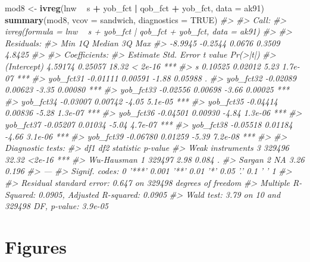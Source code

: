 \documentclass[]{book}
\newenvironment{Shaded}{\begin{snugshade}}{\end{snugshade}}
\newcommand{\CommentTok}[1]{\textcolor[rgb]{0.56,0.35,0.01}{\textit{#1}}}
\newcommand{\DataTypeTok}[1]{\textcolor[rgb]{0.13,0.29,0.53}{#1}}
\newcommand{\KeywordTok}[1]{\textcolor[rgb]{0.13,0.29,0.53}{\textbf{#1}}}
\newcommand{\NormalTok}[1]{#1}
\newcommand{\OperatorTok}[1]{\textcolor[rgb]{0.81,0.36,0.00}{\textbf{#1}}}
\newcommand{\OtherTok}[1]{\textcolor[rgb]{0.56,0.35,0.01}{#1}}
\newcommand{\StringTok}[1]{\textcolor[rgb]{0.31,0.60,0.02}{#1}}
\theoremstyle{definition}
\theoremstyle{definition}
\theoremstyle{definition}
\theoremstyle{remark}
\begin{document}
\begin{Shaded}
\begin{Highlighting}[]
\NormalTok{mod8 <-}\StringTok{ }\KeywordTok{ivreg}\NormalTok{(lnw }\OperatorTok{~}\StringTok{ }\NormalTok{s }\OperatorTok{+}\StringTok{ }\NormalTok{yob_fct }\OperatorTok{|}\StringTok{ }\NormalTok{qob_fct }\OperatorTok{+}\StringTok{ }\NormalTok{yob_fct, }\DataTypeTok{data =}\NormalTok{ ak91)}
\KeywordTok{summary}\NormalTok{(mod8, }\DataTypeTok{vcov =}\NormalTok{ sandwich, }\DataTypeTok{diagnostics =} \OtherTok{TRUE}\NormalTok{)}
\CommentTok{#> }
\CommentTok{#> Call:}
\CommentTok{#> ivreg(formula = lnw ~ s + yob_fct | qob_fct + yob_fct, data = ak91)}
\CommentTok{#> }
\CommentTok{#> Residuals:}
\CommentTok{#>     Min      1Q  Median      3Q     Max }
\CommentTok{#> -8.9945 -0.2544  0.0676  0.3509  4.8425 }
\CommentTok{#> }
\CommentTok{#> Coefficients:}
\CommentTok{#>             Estimate Std. Error t value Pr(>|t|)    }
\CommentTok{#> (Intercept)  4.59174    0.25057   18.32  < 2e-16 ***}
\CommentTok{#> s            0.10525    0.02012    5.23  1.7e-07 ***}
\CommentTok{#> yob_fct31   -0.01111    0.00591   -1.88  0.05988 .  }
\CommentTok{#> yob_fct32   -0.02089    0.00623   -3.35  0.00080 ***}
\CommentTok{#> yob_fct33   -0.02556    0.00698   -3.66  0.00025 ***}
\CommentTok{#> yob_fct34   -0.03007    0.00742   -4.05  5.1e-05 ***}
\CommentTok{#> yob_fct35   -0.04414    0.00836   -5.28  1.3e-07 ***}
\CommentTok{#> yob_fct36   -0.04501    0.00930   -4.84  1.3e-06 ***}
\CommentTok{#> yob_fct37   -0.05207    0.01034   -5.04  4.7e-07 ***}
\CommentTok{#> yob_fct38   -0.05518    0.01184   -4.66  3.1e-06 ***}
\CommentTok{#> yob_fct39   -0.06780    0.01259   -5.39  7.2e-08 ***}
\CommentTok{#> }
\CommentTok{#> Diagnostic tests:}
\CommentTok{#>                     df1    df2 statistic p-value    }
\CommentTok{#> Weak instruments      3 329496     32.32  <2e-16 ***}
\CommentTok{#> Wu-Hausman            1 329497      2.98   0.084 .  }
\CommentTok{#> Sargan                2     NA      3.26   0.196    }
\CommentTok{#> ---}
\CommentTok{#> Signif. codes:  0 '***' 0.001 '**' 0.01 '*' 0.05 '.' 0.1 ' ' 1}
\CommentTok{#> }
\CommentTok{#> Residual standard error: 0.647 on 329498 degrees of freedom}
\CommentTok{#> Multiple R-Squared: 0.0905,  Adjusted R-squared: 0.0905 }
\CommentTok{#> Wald test: 3.79 on 10 and 329498 DF,  p-value: 3.9e-05}
\end{Highlighting}
\end{Shaded}

\hypertarget{figures}{%
\section{Figures}\label{figures}}
\end{document}
